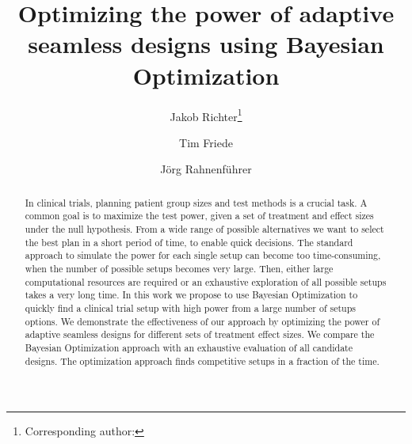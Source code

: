 \documentclass[bimj,fleqn]{w-art}
\theoremstyle{plain}
\theoremstyle{definition}
\begin{document}

\title[Bayesian Optimization of Adaptive Seamless Designs]{Optimizing the power of adaptive seamless designs using Bayesian Optimization} %
\author[Jakob Richter {\it{et al.}}]{Jakob Richter\footnote{Corresponding author: {}}} 
\address[\inst{1}]{Fakultät Statistik, Technische Universität Dortmund, 44221 Dortmund}
\author[dd]{Tim Friede}
\address[\inst{2}]{Institut für Medizinische Statistik, Universitätsmedizin Göttingen, 37073 Göttingen}
\author[]{Jörg Rahnenführer} %
   

\makeatletter
\let\newtitle\@title
\makeatother

\begin{abstract}
In clinical trials, planning patient group sizes and test methods is a crucial task.
A common goal is to maximize the test power, given a set of treatment and effect sizes under the null hypothesis.
From a wide range of possible alternatives we want to select the best plan in a short period of time, to enable quick decisions.
The standard approach to simulate the power for each single setup can become too time-consuming, when the number of possible setups becomes very large.
Then, either large computational resources are required or an exhaustive exploration of all possible setups takes a very long time.
In this work we propose to use Bayesian Optimization to quickly find a clinical trial setup with high power from a large number of setups options.
We demonstrate the effectiveness of our approach by optimizing the power of adaptive seamless designs for different sets of treatment effect sizes.
We compare the Bayesian Optimization approach with an exhaustive evaluation of all candidate designs.
The optimization approach finds competitive setups in a fraction of the time.
\end{abstract}
\end{document}
